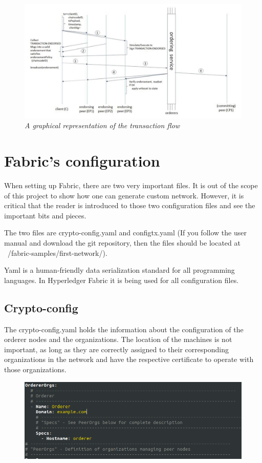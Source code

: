 \documentclass[a4paper,11pt]{report}
\begin{document}
\begin{figure}[h]
\centering
  \includegraphics[width=16cm]{image_preview-7.jpeg}
  \caption{\textit{A graphical representation of the transaction flow \cite{transactionFlow}}}
  \label{transactionFlow}
\end{figure}


\section{Fabric's configuration}
When setting up Fabric, there are two very important files. It is out of the scope of this project to show how one can generate custom network. However, it is critical that the reader is introduced to those two configuration files and see the important bits and pieces. 

	The two files are crypto-config.yaml and configtx.yaml (If you follow the user manual and download the git repository, then the files should be located at ~/fabric-samples/first-network/). 
	
	Yaml is a human-friendly data serialization standard for all programming languages. In Hyperledger Fabric it is being used for all configuration files. 

\subsection{Crypto-config}

The crypto-config.yaml holds the information about the configuration of the orderer nodes and the organizations. The location of the machines is not important, as long as they are correctly assigned to their corresponding organizations in the network and have the respective certificate to operate with those organizations.

\begin{figure}[h]
\centering
  \includegraphics[width = 16cm]{cryptoconfig1.png}
  \caption{ }
  \label{cryptoconfig1}
\end{figure}
\end{document}
